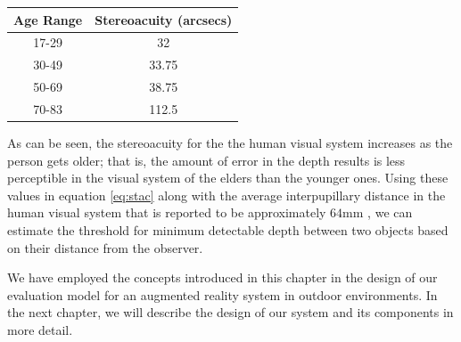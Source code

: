 \begin{minipage}{\linewidth}
\begin{center}
\label{tab:stAcAge}
\begin{tabular}{ |c|c| }
\hline
\textbf{Age Range} & \textbf{Stereoacuity (arcsecs)} \\ \hline
17-29 & 32 \\  \hline
30-49 & 33.75 \\ \hline
50-69 & 38.75 \\ \hline
70-83 & 112.5 \\ \hline
\end{tabular}
\end{center}
\end{minipage} \newline \newline

As can be seen, the stereoacuity for the the human visual system increases as the person gets older; that is, 
the amount of error in the depth results 
is less perceptible in the visual system of the elders than the younger ones.
Using these values in equation \ref{eq:stac} along with the average interpupillary distance in the human visual system 
that is reported to be approximately $64$mm \cite{how95}, 
we can estimate the threshold for minimum detectable depth
between two objects based on their distance from the observer. \newline 

We have employed the concepts introduced in this chapter in the design of our evaluation model for an augmented reality system 
in outdoor environments.
In the next chapter, we will describe the design of our system and its components in more detail.
